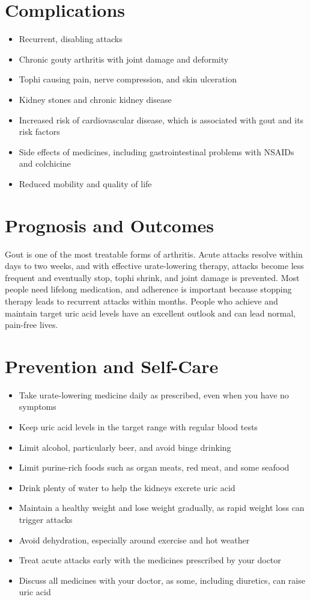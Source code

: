 \section*{Complications}
\begin{itemize}
    \item Recurrent, disabling attacks
    \item Chronic gouty arthritis with joint damage and deformity
    \item Tophi causing pain, nerve compression, and skin ulceration
    \item Kidney stones and chronic kidney disease
    \item Increased risk of cardiovascular disease, which is associated with gout and its risk factors
    \item Side effects of medicines, including gastrointestinal problems with NSAIDs and colchicine
    \item Reduced mobility and quality of life
\end{itemize}

\section*{Prognosis and Outcomes}
Gout is one of the most treatable forms of arthritis. Acute attacks resolve within days to two weeks, and with effective urate-lowering therapy, attacks become less frequent and eventually stop, tophi shrink, and joint damage is prevented. Most people need lifelong medication, and adherence is important because stopping therapy leads to recurrent attacks within months. People who achieve and maintain target uric acid levels have an excellent outlook and can lead normal, pain-free lives.

\section*{Prevention and Self-Care}
\begin{itemize}
    \item Take urate-lowering medicine daily as prescribed, even when you have no symptoms
    \item Keep uric acid levels in the target range with regular blood tests
    \item Limit alcohol, particularly beer, and avoid binge drinking
    \item Limit purine-rich foods such as organ meats, red meat, and some seafood
    \item Drink plenty of water to help the kidneys excrete uric acid
    \item Maintain a healthy weight and lose weight gradually, as rapid weight loss can trigger attacks
    \item Avoid dehydration, especially around exercise and hot weather
    \item Treat acute attacks early with the medicines prescribed by your doctor
    \item Discuss all medicines with your doctor, as some, including diuretics, can raise uric acid
\end{itemize}

